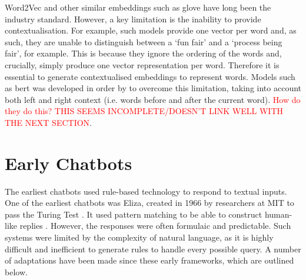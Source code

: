 Word2Vec and other similar embeddings such as \acrshort{glove} \citep{Pennington} have long been the industry standard. However, a key limitation is the inability to provide contextualisation. For example, such models provide one vector per word and, as such, they are unable to distinguish between a `fun fair' and a `process being fair', for example. This is because they ignore the ordering of the words and, crucially, simply produce one vector representation per word. Therefore it is essential to generate contextualised embeddings to represent words. Models such as \acrfull{bert} was developed in order by \citet{devlin2019bert} to overcome this limitation, taking into account both left and right context (i.e. words before and after the current word). \textcolor{red}{How do they do this? THIS SEEMS INCOMPLETE/DOESN'T LINK WELL WITH THE NEXT SECTION}.





\section{Early Chatbots}
\label{sec:background_early_chatbots}

The earliest chatbots used rule-based technology to respond to textual inputs. One of the earliest chatbots was Eliza, created in 1966 by researchers at MIT to pass the Turing Test \citep{zemvcik2019}. It used pattern matching to be able to construct human-like replies \citep{Luka}. However, the responses were often formulaic and predictable. Such systems were limited by the complexity of natural language, as it is highly difficult and inefficient to generate rules to handle every possible query. A number of adaptations have been made since these early frameworks, which are outlined below.

